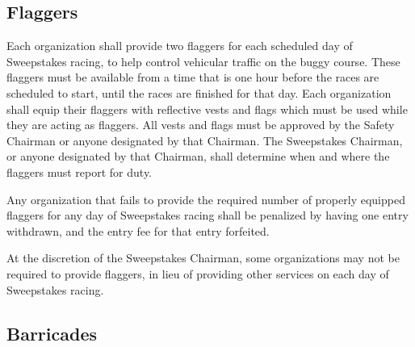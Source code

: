 \documentclass[openany]{book}
\begin{document}
\subsection{Flaggers}

Each organization shall provide two flaggers for each scheduled day of Sweepstakes racing, to help control vehicular traffic on the buggy course. These flaggers must be available from a time that is one hour before the races are scheduled to start, until the races are finished for that day. Each organization shall equip their flaggers with reflective vests and flags which must be used while they are acting as flaggers. All vests and flags must be approved by the Safety Chairman or anyone designated by that Chairman. The Sweepstakes Chairman, or anyone designated by that Chairman, shall determine when and where the flaggers must report for duty.

Any organization that fails to provide the required number of properly equipped flaggers for any day of Sweepstakes racing shall be penalized by having one entry withdrawn, and the entry fee for that entry forfeited.

At the discretion of the Sweepstakes Chairman, some organizations may not be required to provide flaggers, in lieu of providing other services on each day of Sweepstakes racing.

\subsection{Barricades}
\end{document}
